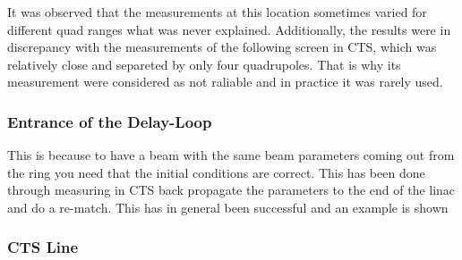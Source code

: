 It was observed that the measurements at this location sometimes 
varied for different quad ranges what was never explained.
Additionally, the results were in discrepancy with the measurements of 
the following screen in CTS, which was relatively close and separeted
by only four quadrupoles. That is why its measurement were considered 
as not raliable and in practice it was rarely used.



\subsubsection{Entrance of the Delay-Loop}

This is because to have a beam with the same beam parameters coming out from 
the ring you need that the initial conditions are correct. 
This has been done through measuring in CTS back propagate the parameters to 
the end of the linac and do a re-match. This has in general been successful and 
an example is shown 
%



\subsubsection{CTS Line}

